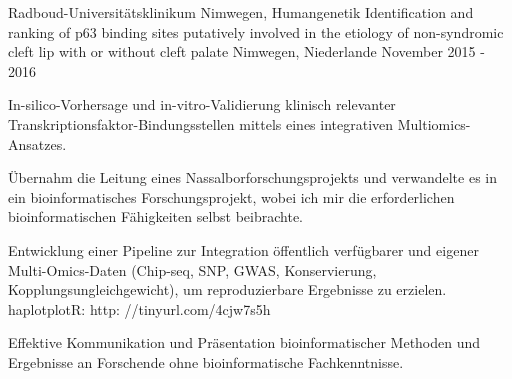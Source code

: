 

\begin{cventries}
  \cventry
    { Radboud-Universitätsklinikum Nimwegen, Humangenetik } %
    { Identification and ranking of p63 binding sites putatively involved in the etiology of non-syndromic cleft lip with or without cleft palate } %
    { Nimwegen, Niederlande } %
    { November 2015 - 2016 } %
    { 
      \begin{cvitems} %
\item { In-silico-Vorhersage und in-vitro-Validierung klinisch relevanter Transkriptionsfaktor-Bindungsstellen mittels eines integrativen Multiomics-Ansatzes. }
\item { Übernahm die Leitung eines Nassalborforschungsprojekts und verwandelte es in ein bioinformatisches Forschungsprojekt, wobei ich mir die erforderlichen bioinformatischen Fähigkeiten selbst beibrachte. }
\item { Entwicklung einer Pipeline zur Integration öffentlich verfügbarer und eigener Multi-Omics-Daten (Chip-seq, SNP, GWAS, Konservierung, Kopplungsungleichgewicht), um reproduzierbare Ergebnisse zu erzielen. haplotplotR: http: //tinyurl.com/4cjw7s5h }
\item { Effektive Kommunikation und Präsentation bioinformatischer Methoden und Ergebnisse an Forschende ohne bioinformatische Fachkenntnisse. }
      \end{cvitems}
    }


\end{cventries}
